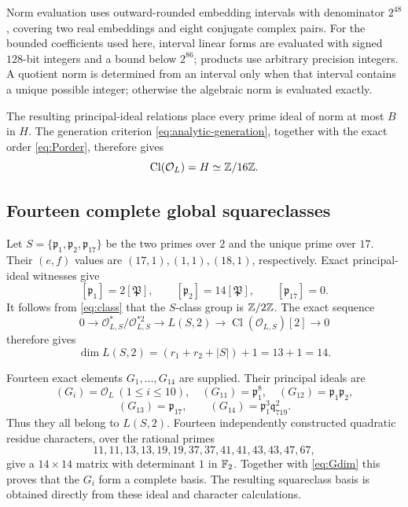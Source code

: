 \documentclass[11pt,a4paper]{article}
\theoremstyle{definition}\newtheorem{definition}[theorem]{Definition}
\theoremstyle{remark}\newtheorem{remark}[theorem]{Remark}
\newcommand{\OO}{\mathcal O}\newcommand{\Cl}{\operatorname{Cl}}
\begin{document}
Norm evaluation uses outward-rounded embedding intervals with denominator $2^{48}$, covering two real embeddings and eight conjugate complex pairs. For the bounded coefficients used here, interval linear forms are evaluated with signed $128$-bit integers and a bound below $2^{86}$; products use arbitrary precision integers. A quotient norm is determined from an interval only when that interval contains a unique possible integer; otherwise the algebraic norm is evaluated exactly.

The resulting principal-ideal relations place every prime ideal of norm at most $B$ in $H$. The generation criterion \eqref{eq:analytic-generation}, together with the exact order \eqref{eq:Porder}, therefore gives
\begin{equation}\label{eq:class}
\Cl(\OO_L)=H\simeq\Z/16\Z.
\end{equation}

\subsection{Fourteen complete global squareclasses}

Let $S=\{\mathfrak p_1,\mathfrak p_2,\mathfrak p_{17}\}$ be the two
primes over $2$ and the unique prime over $17$. Their $(e,f)$ values are
$(17,1),(1,1),(18,1)$, respectively. Exact principal-ideal witnesses give
\[
[\mathfrak p_1]=2[\mathfrak P],\qquad
[\mathfrak p_2]=14[\mathfrak P],\qquad
[\mathfrak p_{17}]=0.
\]
It follows from \eqref{eq:class} that the $S$-class group is $\mathbb Z/2\mathbb Z$.
The exact sequence
\[
0\longrightarrow\OO_{L,S}^*/\OO_{L,S}^{*2}
\longrightarrow L(S,2)\longrightarrow\Cl(\OO_{L,S})[2]
\longrightarrow0
\]
therefore gives
\begin{equation}\label{eq:Gdim}
\dim L(S,2)=(r_1+r_2+|S|)+1=13+1=14.
\end{equation}

Fourteen exact elements $G_1,\ldots,G_{14}$ are supplied. Their principal
ideals are
\[
(G_i)=\OO_L\ (1\le i\le10),\quad
(G_{11})=\mathfrak p_1^8,\quad (G_{12})=\mathfrak p_1\mathfrak p_2,
\]
\[
(G_{13})=\mathfrak p_{17},\qquad
(G_{14})=\mathfrak p_1^3\mathfrak q_{719}^{2}.
\]
Thus they all belong to $L(S,2)$. Fourteen independently constructed
quadratic residue characters, over the rational primes
\[
11,11,13,13,19,19,37,37,41,41,43,43,47,67,
\]
give a $14\times14$ matrix with determinant $1$ in $\mathbb F_2$.
Together with \eqref{eq:Gdim} this proves that the $G_i$ form a complete
basis. The resulting squareclass basis is obtained directly from these ideal and character calculations.
\end{document}
